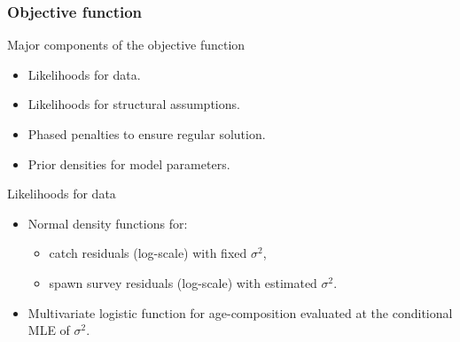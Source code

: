 \begin{frame}[t,allowframebreaks]\frametitle{Objective function}
	\begin{block}
		{Major components of the objective function}
		\begin{itemize}
			\item Likelihoods for data.
			\item Likelihoods for structural assumptions.
			\item Phased penalties to ensure regular solution.
			\item Prior densities for model parameters.
		\end{itemize}
	\end{block}
	\framebreak
	
	\begin{block}	
		{Likelihoods for data}
		\begin{itemize}
			\item Normal density functions for:
			\begin{itemize}
				\item catch residuals (log-scale) with fixed $\sigma^2$,
				\item spawn survey residuals (log-scale) with estimated $\sigma^2$. 
			\end{itemize}
			\item Multivariate logistic function for age-composition evaluated at the conditional MLE of $\sigma^2$.
		\end{itemize}
	\end{block}
\end{frame}

